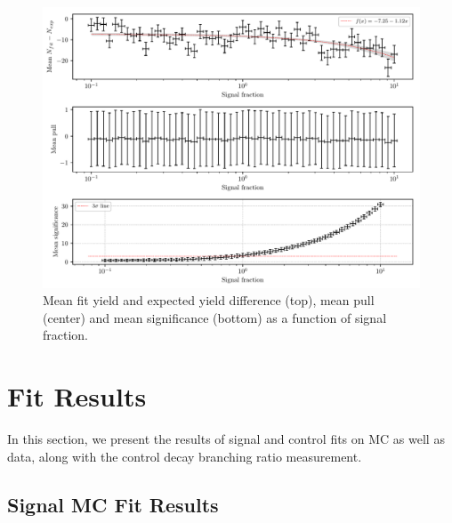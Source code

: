 \begin{figure}[H]
	\centering
	\captionsetup{width=0.8\linewidth}
	\includegraphics[width=\linewidth]{fig/lin_test}
	\caption{Mean fit yield and expected yield difference (top), mean pull (center) and mean significance (bottom) as a function of signal fraction.}
	\label{fig:lin_test}
\end{figure}


\chapter{Fit Results}
\label{sec:fit-results}
In this section, we present the results of signal and control fits on MC as well as data, along with the control decay branching ratio measurement.

\section{Signal MC Fit Results}\label{sec:signal-mc-fit-results}

